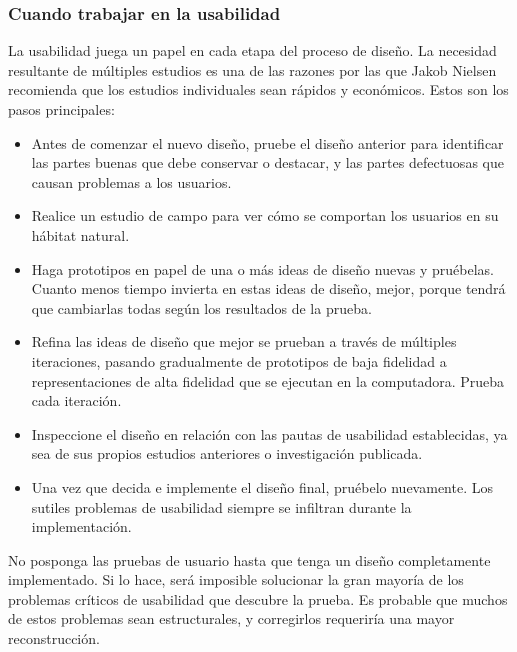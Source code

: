 	\subsubsection{Cuando trabajar en la usabilidad}
		\par 
			La usabilidad juega un papel en cada etapa del proceso de diseño. La necesidad resultante de múltiples estudios es una de las razones por las que Jakob Nielsen recomienda que los estudios individuales sean rápidos y económicos. Estos son los pasos principales:
			
		\begin{itemize}
			\item Antes de comenzar el nuevo diseño, pruebe el diseño anterior para identificar las partes buenas que debe conservar o destacar, y las partes defectuosas que causan problemas a los usuarios.
			
			\item Realice un estudio de campo para ver cómo se comportan los usuarios en su hábitat natural.
			
			\item Haga prototipos en papel de una o más ideas de diseño nuevas y pruébelas. Cuanto menos tiempo invierta en estas ideas de diseño, mejor, porque tendrá que cambiarlas todas según los resultados de la prueba.
			
			\item Refina las ideas de diseño que mejor se prueban a través de múltiples iteraciones, pasando gradualmente de prototipos de baja fidelidad a representaciones de alta fidelidad que se ejecutan en la computadora. Prueba cada iteración.
			
			\item Inspeccione el diseño en relación con las pautas de usabilidad establecidas, ya sea de sus propios estudios anteriores o investigación publicada.
			
			\item Una vez que decida e implemente el diseño final, pruébelo nuevamente. Los sutiles problemas de usabilidad siempre se infiltran durante la implementación.
		\end{itemize}
	
	\par \noindent
		No posponga las pruebas de usuario hasta que tenga un diseño completamente implementado. Si lo hace, será imposible solucionar la gran mayoría de los problemas críticos de usabilidad que descubre la prueba. Es probable que muchos de estos problemas sean estructurales, y corregirlos requeriría una mayor reconstrucción.
		
